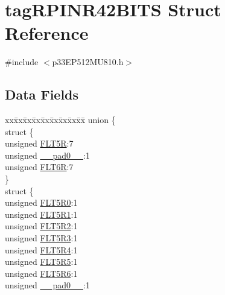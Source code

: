 \hypertarget{structtag_r_p_i_n_r42_b_i_t_s}{}\section{tag\+R\+P\+I\+N\+R42\+B\+I\+TS Struct Reference}
\label{structtag_r_p_i_n_r42_b_i_t_s}


{\ttfamily \#include $<$p33\+E\+P512\+M\+U810.\+h$>$}

\subsection*{Data Fields}
\begin{DoxyCompactItemize}
\item 
\begin{tabbing}
xx\=xx\=xx\=xx\=xx\=xx\=xx\=xx\=xx\=\kill
union \{\\
\>struct \{\\
\>\>unsigned \hyperlink{structtag_r_p_i_n_r42_b_i_t_s_aa6f809f416ff0cbfe1f42ba0e8fba56d}{FLT5R}:7\\
\>\>unsigned \hyperlink{structtag_r_p_i_n_r42_b_i_t_s_adf71f3d8410c1f1dbbc96680a92c49af}{\_\_pad0\_\_}:1\\
\>\>unsigned \hyperlink{structtag_r_p_i_n_r42_b_i_t_s_a7c66356c4bfa74a8450f2f1cba222ed3}{FLT6R}:7\\
\>\} \\
\>struct \{\\
\>\>unsigned \hyperlink{structtag_r_p_i_n_r42_b_i_t_s_a249537aef1bba7b0af2b4542f83f7d41}{FLT5R0}:1\\
\>\>unsigned \hyperlink{structtag_r_p_i_n_r42_b_i_t_s_a46614035bac87134e7594997ef2ad70e}{FLT5R1}:1\\
\>\>unsigned \hyperlink{structtag_r_p_i_n_r42_b_i_t_s_afaa4b8a1d254c0cb422b76f47cf8e15d}{FLT5R2}:1\\
\>\>unsigned \hyperlink{structtag_r_p_i_n_r42_b_i_t_s_a566a8f13770c133e99d94a7ec3347bf0}{FLT5R3}:1\\
\>\>unsigned \hyperlink{structtag_r_p_i_n_r42_b_i_t_s_a939d902abb662c4fd38dd06d441bedcc}{FLT5R4}:1\\
\>\>unsigned \hyperlink{structtag_r_p_i_n_r42_b_i_t_s_a68662e7cf94e9b6cad8ae417812c8428}{FLT5R5}:1\\
\>\>unsigned \hyperlink{structtag_r_p_i_n_r42_b_i_t_s_a8d32d6357293c6e9031709ec907e22fa}{FLT5R6}:1\\
\>\>unsigned \hyperlink{structtag_r_p_i_n_r42_b_i_t_s_adf71f3d8410c1f1dbbc96680a92c49af}{\_\_pad0\_\_}:1\\

\end{tabbing}
\end{DoxyCompactItemize}
